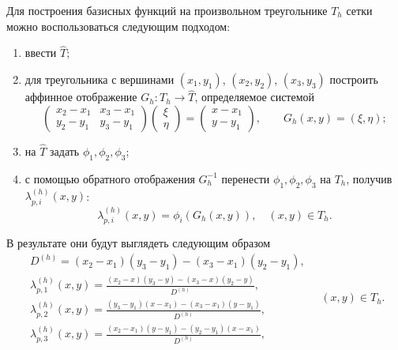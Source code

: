 \documentclass[a4paper,14pt]{extarticle}
\begin{document}
	Для построения базисных функций на произвольном
	треугольнике $T_h$ сетки можно воспользоваться
	следующим подходом:
	\begin{enumerate}
		\item ввести  $\widehat T$;
		
		\item для треугольника с вершинами $(x_1,y_1)$,
		$(x_2,y_2)$, $(x_3,y_3)$ построить аффинное отображение
		$G_h:T_h\to\widehat T$, определяемое системой
		\begin{equation}
			\begin{pmatrix}
				x_2-x_1 & x_3-x_1\\
				y_2-y_1 & y_3-y_1
			\end{pmatrix}
			\begin{pmatrix}
				\xi\\
				\eta
			\end{pmatrix}
			=
			\begin{pmatrix}
				x-x_1\\
				y-y_1
			\end{pmatrix},
			\qquad G_h(x,y)=(\xi,\eta);
		\end{equation}
		
		
		\item на $\widehat T$ задать $\phi_1,\phi_2,\phi_3$;
		
		\item с помощью обратного отображения
		$G_h^{-1}$ перенести $\phi_1,\phi_2,\phi_3$
		на  $T_h$,
		получив 
		$\lambda_{p,i}^{(h)}(x,y)$:
	\begin{equation}
		\lambda^{(h)}_{p,i}(x,y) = \phi_i(G_h(x,y)),\quad (x,y) \in T_h.
	\end{equation}
	\end{enumerate}
	В результате они будут выглядеть следующим образом
	\begin{equation}
	\begin{gathered}
	D^{(h)} = (x_2 - x_1)(y_3 - y_1) - (x_3 - x_1)(y_2 - y_1),
	\\
	\lambda_{p,1}^{(h)}(x,y) =
	\frac{(x_2 - x)(y_3 - y) - (x_3 - x)(y_2 - y)}{D^{(h)}},
	\\
	\lambda_{p,2}^{(h)}(x,y) =
	\frac{(y_3 - y_1)(x - x_1) - (x_3 - x_1)(y - y_1)}{D^{(h)}},
	\\
	\lambda_{p,3}^{(h)}(x,y) =
	\frac{(x_2 - x_1)(y - y_1) - (y_2 - y_1)(x - x_1)}{D^{(h)}},
	\end{gathered}
	\quad (x,y) \in T_h.
	\end{equation}
\end{document}
